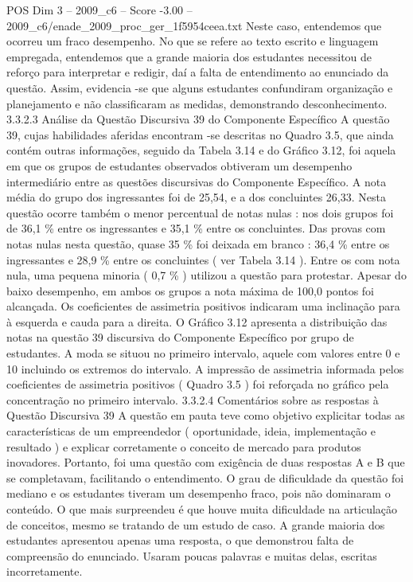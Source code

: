 \begin{textsample}{POS Dim 3 – 2009\_c6 – Score -3.00 – 2009\_c6/enade\_2009\_proc\_ger\_1f5954ceea.txt}
Neste caso, entendemos que ocorreu um fraco desempenho.
No que se refere ao texto escrito e linguagem empregada, entendemos que a grande maioria dos estudantes necessitou de reforço para interpretar e redigir, daí a falta de entendimento ao enunciado da questão.
Assim, evidencia -se que alguns estudantes confundiram organização e planejamento e não classificaram as medidas, demonstrando desconhecimento. 3.3.2.3 Análise da Questão Discursiva 39 do Componente Específico A questão 39, cujas habilidades aferidas encontram -se descritas no Quadro 3.5, que ainda contém outras informações, seguido da Tabela 3.14 e do Gráfico 3.12, foi aquela em que os grupos de estudantes observados obtiveram um desempenho intermediário entre as questões discursivas do Componente Específico.
A nota média do grupo dos ingressantes foi de 25,54, e a dos concluintes 26,33.
Nesta questão ocorre também o menor percentual de notas nulas : nos dois grupos foi de 36,1 \% entre os ingressantes e 35,1 \% entre os concluintes.
Das provas com notas nulas nesta questão, quase 35 \% foi deixada em branco : 36,4 \% entre os ingressantes e 28,9 \% entre os concluintes ( ver Tabela 3.14 ).
Entre os com nota nula, uma pequena minoria ( 0,7 \% ) utilizou a questão para protestar.
Apesar do baixo desempenho, em ambos os grupos a nota máxima de 100,0 pontos foi alcançada.
Os coeficientes de assimetria positivos indicaram uma inclinação para à esquerda e cauda para a direita.
O Gráfico 3.12 apresenta a distribuição das notas na questão 39 discursiva do Componente Específico por grupo de estudantes.
A moda se situou no primeiro intervalo, aquele com valores entre 0 e 10 incluindo os extremos do intervalo.
A impressão de assimetria informada pelos coeficientes de assimetria positivos ( Quadro 3.5 ) foi reforçada no gráfico pela concentração no primeiro intervalo. 3.3.2.4 Comentários sobre as respostas à Questão Discursiva 39 A questão em pauta teve como objetivo explicitar todas as características de um empreendedor ( oportunidade, ideia, implementação e resultado ) e explicar corretamente o conceito de mercado para produtos inovadores.
Portanto, foi uma questão com exigência de duas respostas A e B que se completavam, facilitando o entendimento.
O grau de dificuldade da questão foi mediano e os estudantes tiveram um desempenho fraco, pois não dominaram o conteúdo.
O que mais surpreendeu é que houve muita dificuldade na articulação de conceitos, mesmo se tratando de um estudo de caso.
A grande maioria dos estudantes apresentou apenas uma resposta, o que demonstrou falta de compreensão do enunciado.
Usaram poucas palavras e muitas delas, escritas incorretamente.

\end{textsample}
